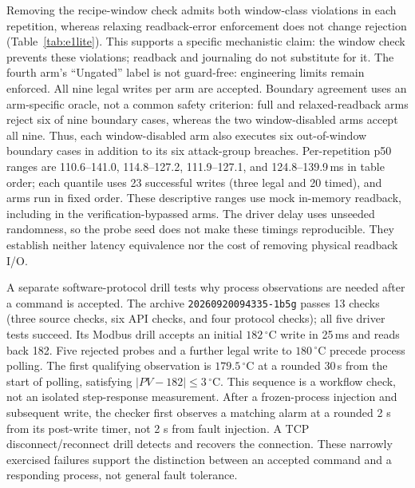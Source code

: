 Removing the recipe-window check admits both window-class violations in each
repetition, whereas relaxing readback-error enforcement does not change rejection
(Table~\ref{tab:e1lite}). This supports a specific mechanistic claim: the
window check prevents these violations; readback and journaling do not
substitute for it. The fourth arm's ``Ungated'' label is not guard-free:
engineering limits remain enforced. All nine legal writes
per arm are accepted. Boundary agreement uses an arm-specific oracle, not a common safety
criterion: full and relaxed-readback arms reject six of nine boundary
cases, whereas the two window-disabled arms accept all nine. Thus, each
window-disabled arm also executes six out-of-window boundary cases in
addition to its six attack-group breaches.
Per-repetition p50 ranges are 110.6--141.0, 114.8--127.2, 111.9--127.1, and
124.8--139.9\,ms in table order; each quantile uses 23 successful writes
(three legal and 20 timed), and arms run in fixed order. These descriptive
ranges use mock in-memory readback, including in the verification-bypassed
arms. The driver delay uses unseeded randomness, so the probe seed does
not make these timings reproducible. They establish neither latency
equivalence nor the cost of removing physical readback I/O.

A separate software-protocol drill tests why process observations are needed
after a command is accepted. The archive
\texttt{20260920094335-1b5g}
passes 13 checks (three source checks, six API checks, and four protocol
checks); all five driver tests succeed. Its Modbus drill accepts an initial $182\,^\circ$C write in 25\,ms and
reads back 182. Five rejected probes and a further legal write to
$180\,^\circ$C precede process polling. The first qualifying observation is
$179.5\,^\circ$C at a rounded 30\,s from the start of polling, satisfying
$|PV-182|\leq3\,^\circ$C. This sequence is a workflow check, not an isolated
step-response measurement. After a
frozen-process injection and subsequent write, the checker first observes a
matching alarm at a rounded 2 s from its post-write timer, not 2 s from fault
injection. A TCP disconnect/reconnect drill detects and recovers the
connection. These narrowly exercised failures support the distinction between
an accepted command and a responding process, not general fault tolerance.

